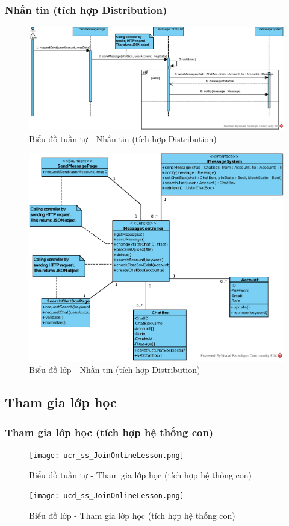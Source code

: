 \documentclass[./../main.tex]{subfiles}
\begin{document}
\subsubsection{Nhắn tin (tích hợp Distribution)}
\begin{figure}[H]
    \centering
    \includegraphics[width=\linewidth]{./images/UseCaseDesignDiagram/ucr_dis_message.eps}
    \caption{Biểu đồ tuần tự - Nhắn tin (tích hợp Distribution)}
\end{figure}
\begin{figure}[H]
    \centering
    \includegraphics[width=\linewidth]{./images/UseCaseDesignDiagram/ucd_dis_message.eps}
    \caption{Biểu đồ lớp - Nhắn tin (tích hợp Distribution)}
\end{figure}

\subsection{Tham gia lớp học}
\subsubsection{Tham gia lớp học (tích hợp hệ thống con)}
\begin{figure}[H]
    \centering
    \texttt{[image: ucr\_ss\_JoinOnlineLesson.png]}
    \caption{Biểu đồ tuần tự - Tham gia lớp học (tích hợp hệ thống con)}
\end{figure}
\begin{figure}[H]
    \centering
    \texttt{[image: ucd\_ss\_JoinOnlineLesson.png]}
    \caption{Biểu đồ lớp - Tham gia lớp học (tích hợp hệ thống con)}
\end{figure}
\end{document}
